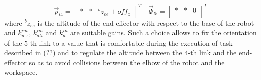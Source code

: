\begin{equation*}
  \vec{p}_{l4} =
  \begin{bmatrix}
    * & * & {}^{b} z_{ee} + off_z
  \end{bmatrix}^{T}
  \quad
  \vec{\Phi}_{l5} =
  \begin{bmatrix}
    * & * & 0\\
  \end{bmatrix}^{T}
\end{equation*}
where ${}^{b} z_{ee}$ is the altitude of the end-effector with respect to the base of the robot
and $k_{p,z}^{im}$, $k_{att}^{im}$ and $k_{d}^{in}$ are suitable gains.
Such a choice allows to fix the orientation of the $5$-th link to a value that is comfortable
during the execution of task described in (??) and to regulate the altitude between the $4$-th link and
the end-effector so as to avoid collisions between the elbow of the robot and the workspace.
